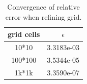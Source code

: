 \documentclass[]{article}
\begin{document}
\begin{table}
	\centering
	\begin{tabular}{|c|c|}
		\hline
		grid cells & $ \epsilon $ \\
		\hline
		10*10 & 3.3183e-03  \\
		\hline
		100*100 & 3.5344e-05  \\
		\hline
		1k*1k & 3.3590e-07 \\
		\hline
	\end{tabular}
	\caption{Convergence of relative error when refining grid.}
	\label{tab:MMS_grid}
\end{table}
\end{document}
